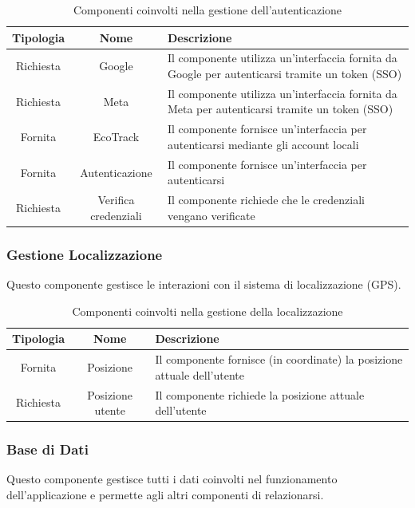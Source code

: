 \begin{table}[H]
    \centering
    \begin{tabular}{|c|c|p{9cm}|}
        \hline
        \textbf{Tipologia} & \textbf{Nome} & \textbf{Descrizione} \\
        \hline
        Richiesta & Google & Il componente utilizza un’interfaccia fornita da Google per autenticarsi tramite un token (SSO) \\
        \hline
        Richiesta & Meta & Il componente utilizza un’interfaccia fornita da Meta per autenticarsi tramite un token (SSO) \\
        \hline
        Fornita & EcoTrack & Il componente fornisce un'interfaccia per autenticarsi mediante gli account locali \\
        \hline
        Fornita & Autenticazione & Il componente fornisce un'interfaccia per autenticarsi \\
        \hline
        Richiesta & Verifica credenziali & Il componente richiede che le credenziali vengano verificate \\
        \hline
    \end{tabular}
    \caption{Componenti coinvolti nella gestione dell'autenticazione}
    \label{tab:gestione_autenticazione}
\end{table}

\subsubsection{Gestione Localizzazione}  
Questo componente gestisce le interazioni con il sistema di localizzazione (GPS).

\begin{table}[H]
    \centering
    \begin{tabular}{|c|c|p{9cm}|}
        \hline
        \textbf{Tipologia} & \textbf{Nome} & \textbf{Descrizione} \\
        \hline
        Fornita & Posizione & Il componente fornisce (in coordinate) la posizione attuale dell'utente \\
        \hline
        Richiesta & Posizione utente & Il componente richiede la posizione attuale dell'utente \\
        \hline
    \end{tabular}
    \caption{Componenti coinvolti nella gestione della localizzazione}
    \label{tab:gestione_localizzazione}
\end{table}

\subsubsection{Base di Dati}  
Questo componente gestisce tutti i dati coinvolti nel funzionamento dell'applicazione e permette agli altri componenti di relazionarsi.

